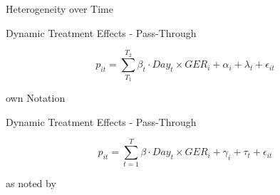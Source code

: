 \begin{frame}{Heterogeneity over Time}


\vspace{-1.2cm}




\begin{block}{Dynamic Treatment Effects - Pass-Through}

\begin{equation}
\label{eq:Dynamic_DiD_short}
p_{it} = \sum_{T_{1}}^{T_{2}} \beta_{t} \cdot Day_{t} \times GER_{i} + \alpha_{i} + \lambda_{t} + \epsilon_{it}
\end{equation}

\begin{tiny}
    own Notation
\end{tiny}


\end{block}





\begin{block}{Dynamic Treatment Effects - Pass-Through}

\begin{equation}
\label{eq:Diff_DiD}
p_{it} = \sum_{t=1}^{T} \beta \cdot Day_{t} \times GER_{i} + \gamma_{i} + \tau_{t} + \epsilon_{it}
\end{equation}

\begin{tiny}
    as noted by \textcite{Frondel2024}
\end{tiny}


\end{block}


    
\end{frame}




































